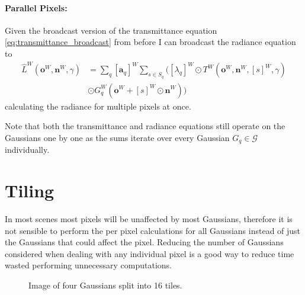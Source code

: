 \documentclass[a4paper, 11pt]{memoir}
\begin{document}
    \paragraph{Parallel Pixels:}
    \label{par:parallel_pixels}
    Given the broadcast version of the \gls{transmittance} equation \eqref{eq:transmittance_broadcast} from before I
    can broadcast the \gls{radiance} equation to
    \begin{equation}
        \begin{aligned}
            \hat{L}^W(\mathbf{o}^W, \mathbf{n}^W, \gamma) &= \sum_q [ \mathbf{a}_q ]^W \sum_{s \in S_q} \Big(
            [ \lambda_q ]^W \odot T^W(\mathbf{o}^W, \mathbf{n}^W, [ s ]^W, \gamma)\\
            &\odot G_q^W(\mathbf{o}^W + [ s ]^W \odot \mathbf{n}^W) \Big)
        \end{aligned}
        \label{eq:radiance_parallel_pixels}
    \end{equation}
    calculating the \gls{radiance} for multiple pixels at once.

    Note that both the \gls{transmittance} and \gls{radiance} equations still operate on the Gaussians one by one as the
    sums iterate over every Gaussian $G_q \in \mathcal{G}$ individually.

    \section{Tiling}
    \label{sec:tiling}
    In most scenes most pixels will be unaffected by most Gaussians, therefore it is not sensible to perform
    the per pixel calculations for all Gaussians instead of just the Gaussians that could affect the pixel.
    Reducing the number of Gaussians considered when dealing with any individual pixel is a good way to reduce
    time wasted performing unnecessary computations.

    \begin{figure}[t]
        \centering
        \caption{Image of four Gaussians split into 16 tiles.}
        \label{fig:tiling}
    \end{figure}
\end{document}

